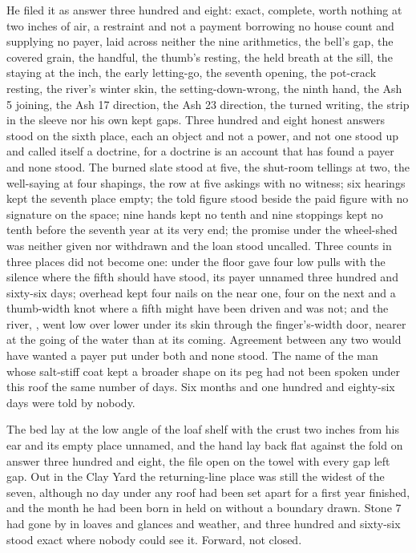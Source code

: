 He filed it as answer three hundred and eight: exact, complete, worth nothing at two inches of air, a restraint and not a payment borrowing no house count and supplying no payer, laid across neither the nine arithmetics, the bell's gap, the covered grain, the handful, the thumb's resting, the held breath at the sill, the staying at the inch, the early letting-go, the seventh opening, the pot-crack resting, the river's winter skin, the setting-down-wrong, the ninth hand, the Ash 5 joining, the Ash 17 direction, the Ash 23 direction, the turned writing, the strip in the sleeve nor his own kept gaps. Three hundred and eight honest answers stood on the sixth place, each an object and not a power, and not one stood up and called itself a doctrine, for a doctrine is an account that has found a payer and none stood. The burned slate stood at five, the shut-room tellings at two, the well-saying at four shapings, the row at five askings with no witness; six hearings kept the seventh place empty; the told figure stood beside the paid figure with no signature on the space; nine hands kept no tenth and nine stoppings kept no tenth before the seventh year at its very end; the promise under the wheel-shed was neither given nor withdrawn and the loan stood uncalled. Three counts in three places did not become one:  under the floor gave four low pulls with the silence where the fifth should have stood, its payer unnamed three hundred and sixty-six days;  overhead kept four nails on the near one, four on the next and a thumb-width knot where a fifth might have been driven and was not; and the river, , went low over lower under its skin through the finger's-width door, nearer at the going of the water than at its coming. Agreement between any two would have wanted a payer put under both and none stood. The name of the man whose salt-stiff coat kept a broader shape on its peg had not been spoken under this roof the same number of days. Six months and one hundred and eighty-six days were told by nobody.

The bed lay at the low angle of the loaf shelf with the crust two inches from his ear and its empty place unnamed, and the hand lay back flat against the fold on answer three hundred and eight, the file open on the towel with every gap left gap. Out in the Clay Yard the returning-line place was still the widest of the seven, although no day under any roof had been set apart for a first year finished, and the month he had been born in held on without a boundary drawn. Stone 7 had gone by in loaves and glances and weather, and three hundred and sixty-six stood exact where nobody could see it. Forward, not closed.

